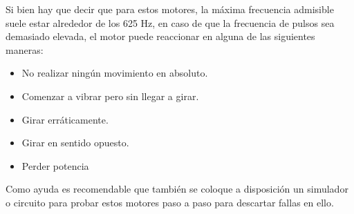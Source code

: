 \documentclass[../main]{subfiles}
\begin{document}

Si bien hay que decir que para estos motores, la máxima frecuencia
admisible suele estar alrededor de los 625 Hz, en caso de que la
frecuencia de pulsos sea demasiado elevada, el motor puede reaccionar
en alguna de las siguientes maneras:
\begin{itemize}

  \item No realizar ningún movimiento en absoluto.
  \item Comenzar a vibrar pero sin llegar a girar.
  \item Girar erráticamente.
  \item Girar en sentido opuesto.
  \item Perder potencia

\end{itemize}

Como ayuda es recomendable que también se coloque a disposición un
simulador o circuito para probar estos motores paso a paso para
descartar fallas en ello.
\end{document}
